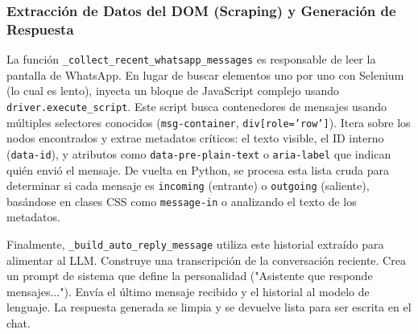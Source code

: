 \documentclass[letterpaper,12pt]{article}
\begin{document}
\subsubsection{Extracción de Datos del DOM (Scraping) y Generación de Respuesta}

La función \texttt{\_collect\_recent\_whatsapp\_messages} es responsable de leer la pantalla de WhatsApp. En lugar de buscar elementos uno por uno con Selenium (lo cual es lento), inyecta un bloque de JavaScript complejo usando \texttt{driver.execute\_script}.
Este script busca contenedores de mensajes usando múltiples selectores conocidos (\texttt{msg-container}, \texttt{div[role='row']}). Itera sobre los nodos encontrados y extrae metadatos críticos: el texto visible, el ID interno (\texttt{data-id}), y atributos como \texttt{data-pre-plain-text} o \texttt{aria-label} que indican quién envió el mensaje.
De vuelta en Python, se procesa esta lista cruda para determinar si cada mensaje es \texttt{incoming} (entrante) o \texttt{outgoing} (saliente), basándose en clases CSS como \texttt{message-in} o analizando el texto de los metadatos.

Finalmente, \texttt{\_build\_auto\_reply\_message} utiliza este historial extraído para alimentar al LLM.
Construye una transcripción de la conversación reciente.
Crea un prompt de sistema que define la personalidad ("Asistente que responde mensajes...").
Envía el último mensaje recibido y el historial al modelo de lenguaje.
La respuesta generada se limpia y se devuelve lista para ser escrita en el chat.
\end{document}
